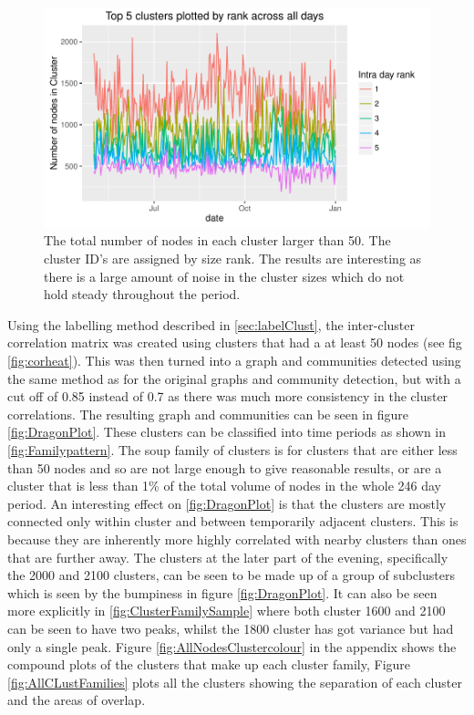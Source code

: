 \begin{figure}[ht]
    \centering
    \includegraphics[width=\textwidth]{Figures/Results/Clusterrank}
    \caption[Size comparison of the largest clusters]{The total number of nodes in each cluster larger than 50. The cluster ID's are assigned by size rank. The results are interesting as there is a large amount of noise in the cluster sizes which do not hold steady throughout the period.}
    \label{fig:clustrank}
\end{figure}
\FloatBarrier 

Using the labelling method described in \ref{sec:labelClust}, the inter-cluster correlation matrix was created using clusters that had a at least 50 nodes (see fig \ref{fig:corheat}). This was then turned into a graph and communities detected using the same method as for the original graphs and community detection, but with a cut off of 0.85 instead of 0.7 as there was much more consistency in the cluster correlations. The resulting graph and communities can be seen in figure \ref{fig:DragonPlot}. These clusters can be classified into time periods as shown in \ref{fig:Familypattern}. The soup family of clusters is for clusters that are either less than 50 nodes and so are not large enough to give reasonable results, or are a cluster that is less than 1\% of the total volume of nodes in the whole 246 day period. An interesting effect on \ref{fig:DragonPlot} is that the clusters are mostly connected only within cluster and between temporarily adjacent clusters. This is because they are inherently more highly correlated with nearby clusters than ones that are further away. The clusters at the later part of the evening, specifically the 2000 and 2100 clusters, can be seen to be made up of a group of subclusters which is seen by the bumpiness in figure \ref{fig:DragonPlot}. It can also be seen more explicitly in \ref{fig:ClusterFamilySample} where both cluster 1600 and 2100 can be seen to have two peaks, whilst the 1800 cluster has got variance but had only a single peak. Figure \ref{fig:AllNodesClustercolour} in the appendix shows the compound plots of the clusters that make up each cluster family, Figure \ref{fig:AllCLustFamilies} plots all the clusters showing the separation of each cluster and the areas of overlap.

